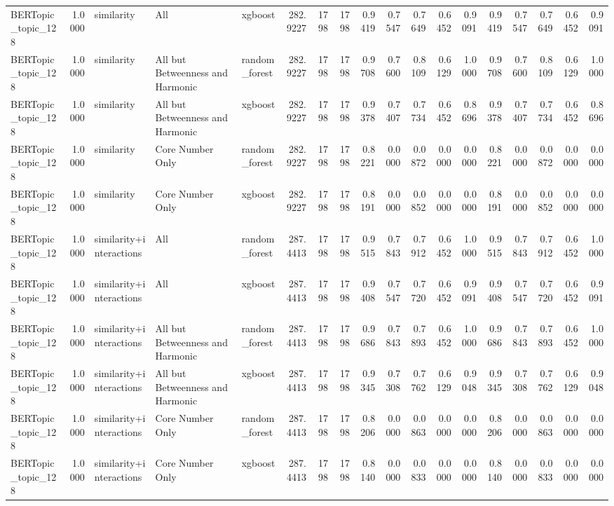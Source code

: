 \begin{tabular}{lrlllrrrrrrrrrrrrr}
BERTopic_topic_128 & 1.0000 & similarity & All & xgboost & 282.9227 & 1798 & 1798 & 0.9419 & 0.7547 & 0.7649 & 0.6452 & 0.9091 & 0.9419 & 0.7547 & 0.7649 & 0.6452 & 0.9091 \\
BERTopic_topic_128 & 1.0000 & similarity & All but Betweenness and Harmonic & random_forest & 282.9227 & 1798 & 1798 & 0.9708 & 0.7600 & 0.8109 & 0.6129 & 1.0000 & 0.9708 & 0.7600 & 0.8109 & 0.6129 & 1.0000 \\
BERTopic_topic_128 & 1.0000 & similarity & All but Betweenness and Harmonic & xgboost & 282.9227 & 1798 & 1798 & 0.9378 & 0.7407 & 0.7734 & 0.6452 & 0.8696 & 0.9378 & 0.7407 & 0.7734 & 0.6452 & 0.8696 \\
BERTopic_topic_128 & 1.0000 & similarity & Core Number Only & random_forest & 282.9227 & 1798 & 1798 & 0.8221 & 0.0000 & 0.0872 & 0.0000 & 0.0000 & 0.8221 & 0.0000 & 0.0872 & 0.0000 & 0.0000 \\
BERTopic_topic_128 & 1.0000 & similarity & Core Number Only & xgboost & 282.9227 & 1798 & 1798 & 0.8191 & 0.0000 & 0.0852 & 0.0000 & 0.0000 & 0.8191 & 0.0000 & 0.0852 & 0.0000 & 0.0000 \\
BERTopic_topic_128 & 1.0000 & similarity+interactions & All & random_forest & 287.4413 & 1798 & 1798 & 0.9515 & 0.7843 & 0.7912 & 0.6452 & 1.0000 & 0.9515 & 0.7843 & 0.7912 & 0.6452 & 1.0000 \\
BERTopic_topic_128 & 1.0000 & similarity+interactions & All & xgboost & 287.4413 & 1798 & 1798 & 0.9408 & 0.7547 & 0.7720 & 0.6452 & 0.9091 & 0.9408 & 0.7547 & 0.7720 & 0.6452 & 0.9091 \\
BERTopic_topic_128 & 1.0000 & similarity+interactions & All but Betweenness and Harmonic & random_forest & 287.4413 & 1798 & 1798 & 0.9686 & 0.7843 & 0.7893 & 0.6452 & 1.0000 & 0.9686 & 0.7843 & 0.7893 & 0.6452 & 1.0000 \\
BERTopic_topic_128 & 1.0000 & similarity+interactions & All but Betweenness and Harmonic & xgboost & 287.4413 & 1798 & 1798 & 0.9345 & 0.7308 & 0.7762 & 0.6129 & 0.9048 & 0.9345 & 0.7308 & 0.7762 & 0.6129 & 0.9048 \\
BERTopic_topic_128 & 1.0000 & similarity+interactions & Core Number Only & random_forest & 287.4413 & 1798 & 1798 & 0.8206 & 0.0000 & 0.0863 & 0.0000 & 0.0000 & 0.8206 & 0.0000 & 0.0863 & 0.0000 & 0.0000 \\
BERTopic_topic_128 & 1.0000 & similarity+interactions & Core Number Only & xgboost & 287.4413 & 1798 & 1798 & 0.8140 & 0.0000 & 0.0833 & 0.0000 & 0.0000 & 0.8140 & 0.0000 & 0.0833 & 0.0000 & 0.0000 \\

\end{tabular}
